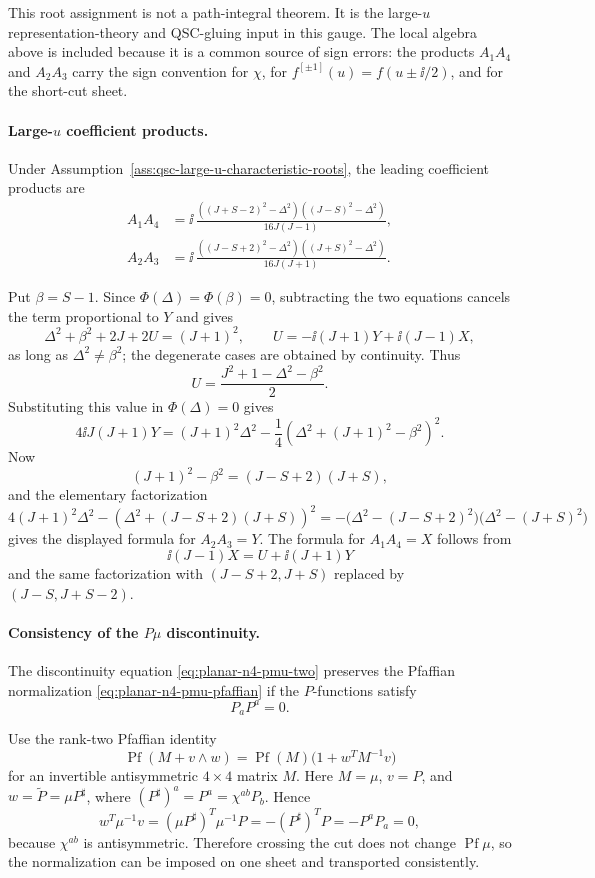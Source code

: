 This root assignment is not a path-integral theorem.  It is the large-\(u\)
representation-theory and QSC-gluing input in this gauge.  The local algebra
above is included because it is a common source of sign errors:
the products \(A_1A_4\) and \(A_2A_3\) carry the sign convention for
\(\chi\), for \(f^{[\pm1]}(u)=f(u\pm\ii/2)\), and for the short-cut sheet.

\paragraph{Large-\(u\) coefficient products.}
Under Assumption~\ref{ass:qsc-large-u-characteristic-roots}, the leading
coefficient products are
\[
\begin{aligned}
  A_1A_4
  &=
  \ii\,
  \frac{((J+S-2)^2-\Delta^2)((J-S)^2-\Delta^2)}
       {16J(J-1)},\\
  A_2A_3
  &=
  \ii\,
  \frac{((J-S+2)^2-\Delta^2)((J+S)^2-\Delta^2)}
       {16J(J+1)}.
\end{aligned}
\]

Put \(\beta=S-1\).  Since \(\Phi(\Delta)=\Phi(\beta)=0\), subtracting the
two equations cancels the term proportional to \(Y\) and gives
\[
  \Delta^2+\beta^2+2J+2U=(J+1)^2,
  \qquad
  U=-\ii(J+1)Y+\ii(J-1)X,
\]
as long as \(\Delta^2\neq\beta^2\); the degenerate cases are obtained by
continuity.  Thus
\[
  U=\frac{J^2+1-\Delta^2-\beta^2}{2}.
\]
Substituting this value in \(\Phi(\Delta)=0\) gives
\[
  4\ii J(J+1)Y
  =
  (J+1)^2\Delta^2
  -
  \frac14\left(\Delta^2+(J+1)^2-\beta^2\right)^2 .
\]
Now
\[
  (J+1)^2-\beta^2=(J-S+2)(J+S),
\]
and the elementary factorization
\[
  4(J+1)^2\Delta^2
  -
  \left(\Delta^2+(J-S+2)(J+S)\right)^2
  =
  -\bigl(\Delta^2-(J-S+2)^2\bigr)
   \bigl(\Delta^2-(J+S)^2\bigr)
\]
gives the displayed formula for \(A_2A_3=Y\).  The formula for
\(A_1A_4=X\) follows from
\[
  \ii(J-1)X=U+\ii(J+1)Y
\]
and the same factorization with
\((J-S+2,J+S)\) replaced by \((J-S,J+S-2)\).

\paragraph{Consistency of the \(P\mu\) discontinuity.}
The discontinuity equation
\eqref{eq:planar-n4-pmu-two} preserves the Pfaffian normalization
\eqref{eq:planar-n4-pmu-pfaffian} if the \(P\)-functions satisfy
\[
  P_aP^a=0 .
\]

Use the rank-two Pfaffian identity
\[
  \operatorname{Pf}(M+v\wedge w)
  =
  \operatorname{Pf}(M)\bigl(1+w^TM^{-1}v\bigr)
\]
for an invertible antisymmetric \(4\times4\) matrix \(M\).  Here
\(M=\mu\), \(v=P\), and \(w=\widetilde P=\mu P^\sharp\), where
\((P^\sharp)^a=P^a=\chi^{ab}P_b\).  Hence
\[
  w^T\mu^{-1}v
  =
  (\mu P^\sharp)^T\mu^{-1}P
  =
  -(P^\sharp)^TP
  =
  -P^aP_a
  =
  0,
\]
because \(\chi^{ab}\) is antisymmetric.  Therefore crossing the cut does not
change \(\operatorname{Pf}\mu\), so the normalization can be imposed on one
sheet and transported consistently.

